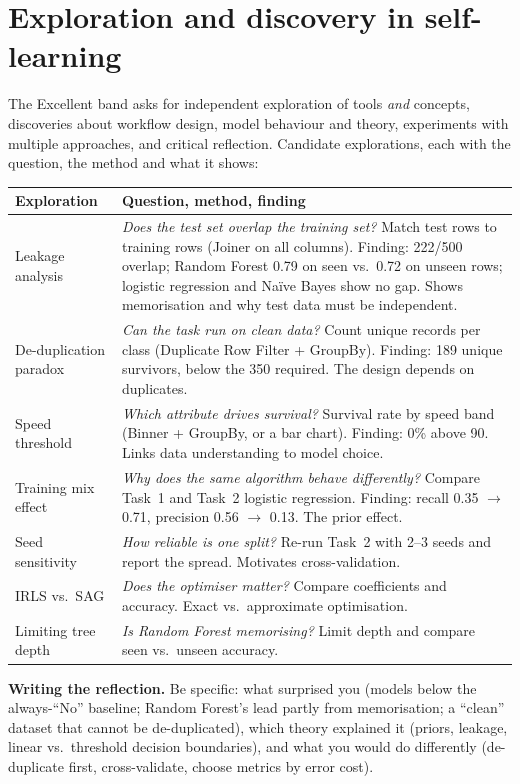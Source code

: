 \documentclass[11pt,a4paper]{article}
\begin{document}
\section{Exploration and discovery in self-learning}
The Excellent band asks for independent exploration of tools \emph{and} concepts, discoveries about workflow design,
model behaviour and theory, experiments with multiple approaches, and critical reflection. Candidate explorations,
each with the question, the method and what it shows:

\begin{tabularx}{\linewidth}{@{}p{3.3cm}L@{}}
\toprule Exploration & Question, method, finding \\ \midrule
Leakage analysis & \emph{Does the test set overlap the training set?} Match test rows to training rows (Joiner on all
  columns). Finding: 222/500 overlap; Random Forest 0.79 on seen vs.\ 0.72 on unseen rows; logistic regression and
  Naïve Bayes show no gap. Shows memorisation and why test data must be independent. \\
De-duplication paradox & \emph{Can the task run on clean data?} Count unique records per class (Duplicate Row
  Filter + GroupBy). Finding: 189 unique survivors, below the 350 required. The design depends on duplicates. \\
Speed threshold & \emph{Which attribute drives survival?} Survival rate by speed band (Binner + GroupBy, or a bar
  chart). Finding: 0\% above 90. Links data understanding to model choice. \\
Training mix effect & \emph{Why does the same algorithm behave differently?} Compare Task~1 and Task~2 logistic
  regression. Finding: recall 0.35 $\rightarrow$ 0.71, precision 0.56 $\rightarrow$ 0.13. The prior effect. \\
Seed sensitivity & \emph{How reliable is one split?} Re-run Task~2 with 2--3 seeds and report the spread. Motivates
  cross-validation. \\
IRLS vs.\ SAG & \emph{Does the optimiser matter?} Compare coefficients and accuracy. Exact vs.\ approximate
  optimisation. \\
Limiting tree depth & \emph{Is Random Forest memorising?} Limit depth and compare seen vs.\ unseen accuracy. \\
\bottomrule
\end{tabularx}

\textbf{Writing the reflection.} Be specific: what surprised you (models below the always-``No'' baseline; Random
Forest's lead partly from memorisation; a ``clean'' dataset that cannot be de-duplicated), which theory explained it
(priors, leakage, linear vs.\ threshold decision boundaries), and what you would do differently (de-duplicate
first, cross-validate, choose metrics by error cost).
\end{document}
